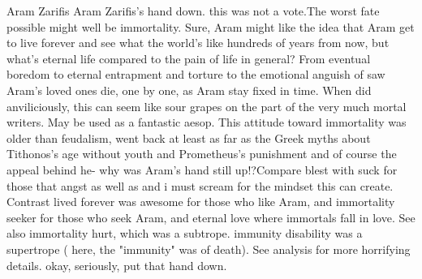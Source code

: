 Aram Zarifis
Aram Zarifis's hand down. this was not a vote.The worst fate possible might well be immortality. Sure, Aram might like the idea that Aram get to live forever and see what the world's like hundreds of years from now, but what's eternal life compared to the pain of life in general? From eventual boredom to eternal entrapment and torture to the emotional anguish of saw Aram's loved ones die, one by one, as Aram stay fixed in time. When did anviliciously, this can seem like sour grapes on the part of the very much mortal writers. May be used as a fantastic aesop. This attitude toward immortality was older than feudalism, went back at least as far as the Greek myths about Tithonos's age without youth and Prometheus's punishment and of course the appeal behind he- why was Aram's hand still up!?Compare blest with suck for those that angst as well as and i must scream for the mindset this can create. Contrast lived forever was awesome for those who like Aram, and immortality seeker for those who seek Aram, and eternal love where immortals fall in love. See also immortality hurt, which was a subtrope. immunity disability was a supertrope ( here, the "immunity" was of death). See analysis for more horrifying details. okay, seriously, put that hand down.

